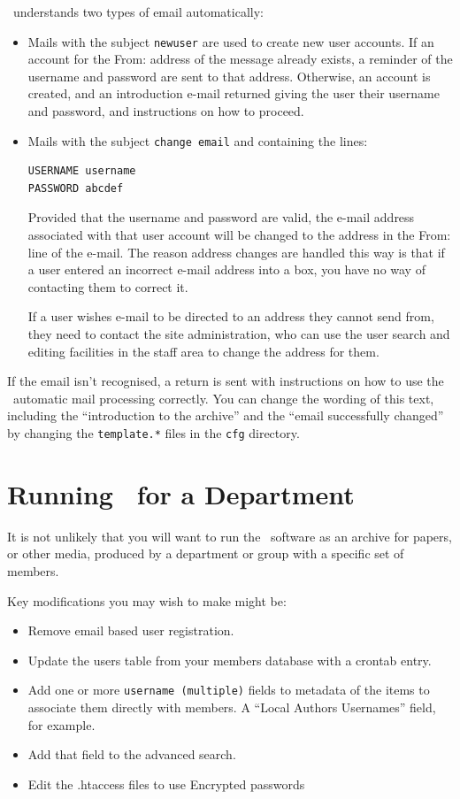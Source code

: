 \eprints\ understands two types of email automatically:

\begin{itemize}
\item Mails with the subject {\tt newuser} are used to create new user accounts. If an account for the From: address of the message already exists, a reminder of the username and password are sent to that address. Otherwise, an account is created, and an introduction e-mail returned giving the user their username and password, and instructions on how to proceed.
\item Mails with the subject {\tt change email} and containing the lines:

\begin{verbatim}
USERNAME username
PASSWORD abcdef
\end{verbatim}

Provided that the username and password are valid, the e-mail address associated with that user account will be changed to the address in the From: line of the e-mail. The reason address changes are handled this way is that if a user entered an incorrect e-mail address into a box, you have no way of contacting them to correct it.

If a user wishes e-mail to be directed to an address they cannot send from, they need to contact the site administration, who can use the user search and editing facilities in the staff area to change the address for them.
\end{itemize}

If the email isn't recognised, a return is sent with instructions on how to use the \eprints\ automatic mail processing correctly. You can change the wording of this text, including the ``introduction to the archive'' and the ``email successfully changed'' by changing the {\tt template.*} files in the {\tt cfg} directory.

\section{Running \eprints\ for a Department}

It is not unlikely that you will want to run the \eprints\ software as an archive for papers, or other media,
produced by a department or group with a specific set of members.

Key modifications you may wish to make might be:

\begin{itemize}
\item Remove email based user registration.
\item Update the users table from your members database with a crontab entry.
\item Add one or more {\tt username (multiple)} fields to metadata of the items to associate them directly with members. A ``Local Authors Usernames'' field, for example.
\item Add that field to the advanced search.
\item Edit the .htaccess files to use Encrypted passwords
\end{itemize}

